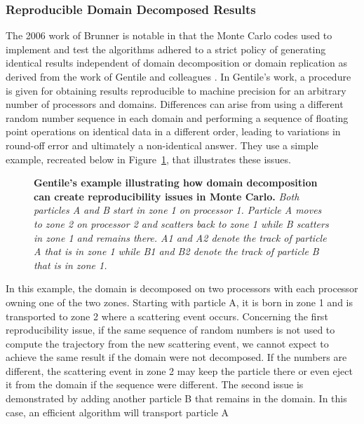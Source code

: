 \subsubsection{Reproducible Domain Decomposed Results}
\label{subsubsec:reproducible_mc}
The 2006 work of Brunner is notable in that the Monte Carlo codes used
to implement and test the algorithms adhered to a strict policy of
generating identical results independent of domain decomposition or
domain replication as derived from the work of Gentile and colleagues
\citep{gentile_obtaining_2005}. In Gentile's work, a procedure is
given for obtaining results reproducible to machine precision for an
arbitrary number of processors and domains. Differences can arise from
using a different random number sequence in each domain and performing
a sequence of floating point operations on identical data in a
different order, leading to variations in round-off error and
ultimately a non-identical answer. They use a simple example,
recreated below in Figure~\ref{fig:gentile_example}, that illustrates
these issues.
\begin{figure}[htpb!]
  \begin{center}
    \scalebox{1.5}{
       }
  \end{center}
  \caption{\textbf{Gentile's example illustrating how domain
      decomposition can create reproducibility issues in Monte Carlo.}
    \textit{Both particles A and B start in zone 1 on processor
      1. Particle A moves to zone 2 on processor 2 and scatters back
      to zone 1 while B scatters in zone 1 and remains there. A1 and
      A2 denote the track of particle A that is in zone 1 while B1 and
      B2 denote the track of particle B that is in zone 1.}}
  \label{fig:gentile_example}
\end{figure}
In this example, the domain is decomposed on two processors with each
processor owning one of the two zones. Starting with particle A, it is
born in zone 1 and is transported to zone 2 where a scattering event
occurs. Concerning the first reproducibility issue, if the same
sequence of random numbers is not used to compute the trajectory from
the new scattering event, we cannot expect to achieve the same result
if the domain were not decomposed. If the numbers are different, the
scattering event in zone 2 may keep the particle there or even eject
it from the domain if the sequence were different. The second issue is
demonstrated by adding another particle B that remains in the
domain. In this case, an efficient algorithm will transport particle A
